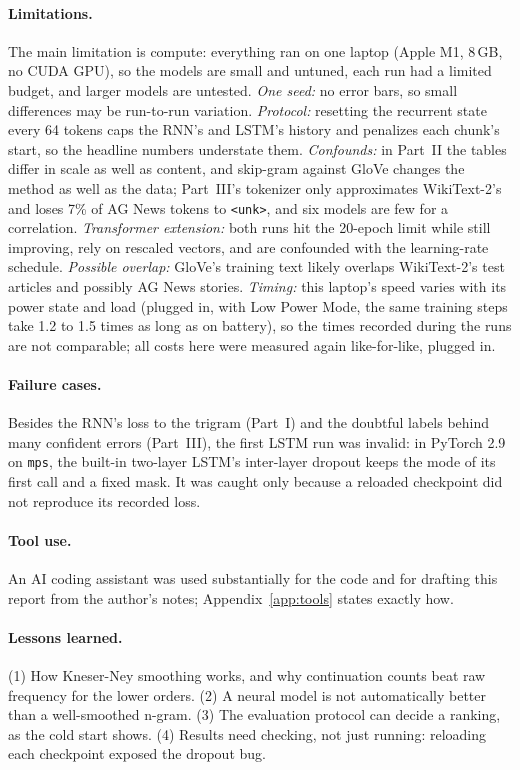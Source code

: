 \documentclass[10pt]{article}
\newcommand{\tok}[1]{\texttt{#1}}
\begin{document}
\paragraph{Limitations.} The main limitation is compute: everything ran on one laptop (Apple M1, 8\,GB, no CUDA GPU), so the models are small and untuned, each run had a limited budget, and larger models are untested. \emph{One seed:} no error bars, so small differences may be run-to-run variation. \emph{Protocol:} resetting the recurrent state every 64 tokens caps the RNN's and LSTM's history and penalizes each chunk's start, so the headline numbers understate them. \emph{Confounds:} in Part~II the tables differ in scale as well as content, and skip-gram against GloVe changes the method as well as the data; Part~III's tokenizer only approximates WikiText-2's and loses 7\% of AG News tokens to \tok{<unk>}, and six models are few for a correlation. \emph{Transformer extension:} both runs hit the 20-epoch limit while still improving, rely on rescaled vectors, and are confounded with the learning-rate schedule. \emph{Possible overlap:} GloVe's training text likely overlaps WikiText-2's test articles and possibly AG News stories. \emph{Timing:} this laptop's speed varies with its power state and load (plugged in, with Low Power Mode, the same training steps take 1.2 to 1.5 times as long as on battery), so the times recorded during the runs are not comparable; all costs here were measured again like-for-like, plugged in.

\paragraph{Failure cases.} Besides the RNN's loss to the trigram (Part~I) and the doubtful labels behind many confident errors (Part~III), the first LSTM run was invalid: in PyTorch 2.9 on \tok{mps}, the built-in two-layer LSTM's inter-layer dropout keeps the mode of its first call and a fixed mask. It was caught only because a reloaded checkpoint did not reproduce its recorded loss.

\paragraph{Tool use.} An AI coding assistant was used substantially for the code and for drafting this report from the author's notes; Appendix~\ref{app:tools} states exactly how.

\paragraph{Lessons learned.} (1) How Kneser-Ney smoothing works, and why continuation counts beat raw frequency for the lower orders. (2) A neural model is not automatically better than a well-smoothed n-gram. (3) The evaluation protocol can decide a ranking, as the cold start shows. (4) Results need checking, not just running: reloading each checkpoint exposed the dropout bug.
\end{document}

